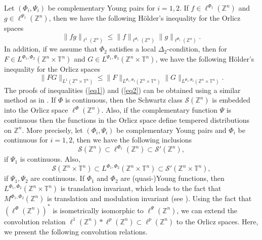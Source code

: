 \documentclass[a4paper,11pt, reqno]{amsart}
\theoremstyle{plain}
\theoremstyle{definition}
\theoremstyle{remark}
\def \Z{{\mathbb Z}}
\def \T{{\mathbb T}}
\begin{document}
Let $\left(\Phi_i, \Psi_i \right)$ be complementary Young pairs for $i = 1, 2$. If $f \in \ell^{\Phi_1} (\Z^n)$ and $g \in \ell^{\Psi_1} (\Z^n)$, then we have the following H\"older's inequality for the Orlicz spaces
\begin{equation}\label{eq1}
\| fg \|_{\ell^{1} (\Z^n)} \leq \|f\|_{\ell^{\Phi_1} (\Z^n)} \|g\|_{\ell^{\Psi_1} (\Z^n)}.
\end{equation}
In addition, if we assume that $\Phi_2$ satisfies a local $\Delta_2$-condition, then for $F \in L^{\Phi_1, \Phi_2} (\Z^n \times \T^n) $ and $G \in L^{\Psi_1, \Psi_2} (\Z^n \times \T^n)$, we have the following H\"older's inequality for the Orlicz spaces 
\begin{equation}\label{eq2}
\| FG \|_{L^{1} (\Z^n \times \T^n)} \leq \|F\|_{L^{\Phi_1, \Phi_2} (\Z^n \times \T^n)} \|G\|_{ L^{\Psi_1, \Psi_2} (\Z^n \times \T^n)}.
\end{equation} 
The proofs of inequalities (\ref{eq1}) and (\ref{eq2}) can be obtained using a similar method as in \cite{rao91}. If $\Phi$ is continuous, then the Schwartz class $\mathcal{S}(\Z^n)$ is embedded into the Orlicz space $\ell^{\Phi} (\Z^n)$. Also, if the complementary function $\Psi$ is continuous then the functions in the Orlicz space define tempered distributions on $\Z^n$. More precisely, let $\left(\Phi_i, \Psi_i \right)$ be complementary Young pairs and $\Phi_i$ be continuous for $i = 1, 2$, then we have the following inclusions 
$$\mathcal{S}(\Z^n) \subset \ell^{\Phi_1} (\Z^n) \subset \mathcal{S'}(\Z^n), $$
if $\Psi_1 $ is continuous. Also,
$$\mathcal{S}(\Z^n \times \T^n) \subset L^{\Phi_1, \Phi_2} (\Z^n \times \T^n) \subset \mathcal{S'}(\Z^n \times \T^n), $$ 
if $\Psi_1, \Psi_2 $ are continuous. If $\Phi_1$ and $\Phi_2$ are (quasi-)Young functions, then $L^{\Phi_1, \Phi_2} (\Z^n \times \T^n)$ is translation invariant, which leads to the fact that $M^{\Phi_1, \Phi_2}(\Z^n)$ is translation and modulation invariant (see \cite{tof22}). Using the fact that $\left(\ell^{\Phi} (\Z^n)\right)^*$ is isometrically isomorphic to $\ell^{\Psi} (\Z^n)$, we can extend the convolution relation $\ell^{1} (\Z^n) * \ell^{p} (\Z^n) \subset \ell^{p} (\Z^n)$ to the Orlicz spaces. Here, we present the following convolution relations.
\end{document}
